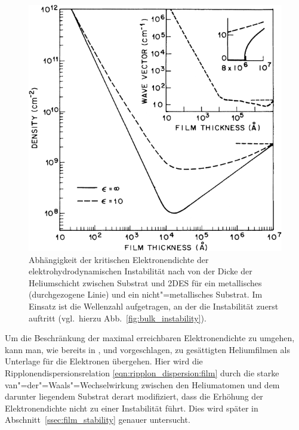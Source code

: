 \begin{figure}[h!tbp]
    \includegraphics[width=\smallwidth]{theo_electrons_on_helium/stability}\hfill
    \begin{minipage}[b]{\textwidth-\smallwidth-2\tabcolsep}
        \caption[Kritische Elektronendichten der elektrohydrodynamischen Instabilität.]{Abhängigkeit der kritischen Elektronendichte der elektrohydrodynamischen Instabilität nach  \cite{Pee84} von der Dicke der Heliumschicht zwischen Substrat und 2DES für ein metallisches (durchgezogene Linie) und ein nicht"=metallisches Substrat. Im Einsatz ist die Wellenzahl aufgetragen, an der die Instabilität zuerst auftritt (vgl.\ hierzu Abb.~\ref{fig:bulk_instability}).}
        \label{fig:bulk_instability_dep}
    \end{minipage}
\end{figure}

Um die Beschränkung der maximal erreichbaren Elektronendichte zu umgehen, kann man, wie bereits in \cite{Ike81}, \cite{Mon82} und \cite{Wil82} vorgeschlagen, zu gesättigten Heliumfilmen als Unterlage für die Elektronen übergehen. Hier wird die Ripplonendispersionsrelation \eqref{eqn:ripplon_dispersion:film} durch die starke van"=der"=Waals"=Wechselwirkung zwischen den Heliumatomen und dem darunter liegendem Substrat derart modifiziert, dass die Erhöhung der Elektronendichte nicht zu einer Instabilität führt. Dies wird später in Abschnitt~\ref{ssec:film_stability} genauer untersucht.

